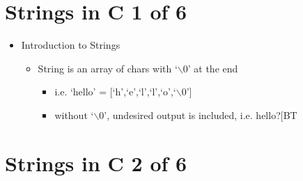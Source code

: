 \documentclass[12pt]{article}
\begin{document}
\bigskip

\section*{Strings in C 1 of 6}

\bigskip

\begin{itemize}
    \item Introduction to Strings
    \begin{itemize}
        \item String is an array of chars with `$\backslash0$' at the end
        \begin{itemize}
            \item i.e. `hello' = [`h',`e',`l',`l',`o',`$\backslash0$']
            \item without `$\backslash0$', undesired output is included, i.e. hello?[BT

    \end{itemize}
    \end{itemize}
\end{itemize}

\bigskip

\section*{Strings in C 2 of 6}

\bigskip
\end{document}
